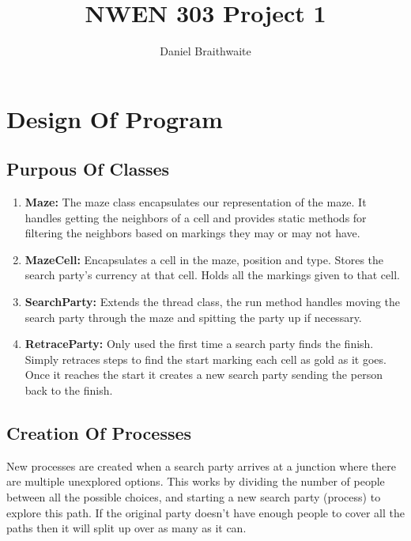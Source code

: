 \documentclass[a4paper, 12pt]{article}
\title{NWEN 303 Project 1}
\author{Daniel Braithwaite}
\begin{document}
	\maketitle
	\newpage
  	
	\section{Design Of Program}
		\subsection{Purpous Of Classes}
			\begin{enumerate}
				\item \textbf{Maze:} The maze class encapsulates our representation of the maze. It handles getting the neighbors of a cell and provides static methods for filtering the neighbors based on markings they may or may not have.
				
				\item \textbf{MazeCell:} Encapsulates a cell in the maze, position and type. Stores the search party's currency at that cell. Holds all the markings given to that cell.
				
				\item \textbf{SearchParty:} Extends the thread class, the run method handles moving the search party through the maze and spitting the party up if necessary.

				
				\item \textbf{RetraceParty:} Only used the first time a search party finds the finish. Simply retraces steps to find the start marking each cell as gold as it goes. Once it reaches the start it creates a new search party sending the person back to the finish.
				
			\end{enumerate}
			
		\subsection{Creation Of Processes}
			New processes are created when a search party arrives at a junction where there are multiple unexplored options. This works by dividing the number of people between all the possible choices, and starting a new search party (process) to explore this path. If the original party doesn't have enough people to cover all the paths then it will split up over as many as it can.\\
			
\end{document}
